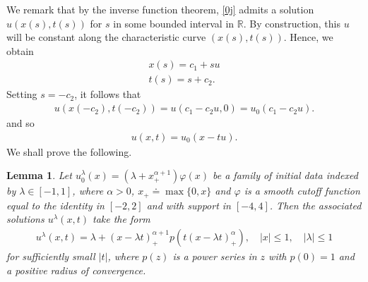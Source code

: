 \documentclass[12pt,reqno]{amsart}
\numberwithin{equation}{section}  %
\numberwithin{figure}{section}
\newcommand{\rr}{\mathbb{R}}
\newcommand{\vp}{\varphi}
\newtheorem{lemma}[theorem]{Lemma}
\begin{document}
We remark that by the inverse function theorem, \eqref{0j} admits a solution
$u(x(s), t(s))$ for $s$ in some bounded interval in $\rr$.  By construction, this $u$ will be constant along the characteristic curve $(x(s), t(s))$. Hence, we obtain
%
%
\begin{gather}
    \label{1j}
    x(s) = c_{1} + su
    \\
    \label{2j}
    t(s) = s + c_{2}.
\end{gather}
%
%
Setting $s = -c_{2}$, it follows that 
%
%
%
\begin{equation*}
\begin{split}
u(x(-c_{2}), t(-c_{2})) = u(c_{1} - c_{2}u, 0 ) = u_{0}(c_{1} - c_{2} u).
\end{split}
\end{equation*}
%
%
and so
%
%
%
%
\begin{equation*}
\begin{split}
u(x,t) = u_{0}(x - tu).
\end{split}
\end{equation*}
%
%
We shall prove the following.
%
%
%
%
%
%
%
%
\begin{lemma}
%
Let $u_{0}^{\lambda}(x) = (\lambda +
x_{+}^{\alpha + 1}) \vp(x)$ be a family of initial data indexed by $\lambda \in
[-1, 1]$, where $\alpha > 0$, $x_{+} \doteq \max\{0, x\}$ and $\vp$ is a smooth cutoff
function equal to the identity in $[-2, 2]$ and with support in $[-4,4]$. Then the associated solutions $u^{\lambda}(x,t)$ take the form
\begin{equation}
    \label{u-lam-explicit-form}
    \begin{split}
        u^{\lambda}(x,t) = \lambda + (x - \lambda t)^{\alpha + 1}_{+} p(t(x- \lambda t)^{\alpha}_{+}), \quad | x | \le 1, \quad | \lambda | \le 1
    \end{split}
\end{equation}
%
%
for sufficiently small $| t |$, where $p(z)$ is a power series in $z$ with $p(0) =1$ and a positive radius of convergence.
\label{lem:sol-burg}
\end{lemma}
%
%
%
%
\end{document}
